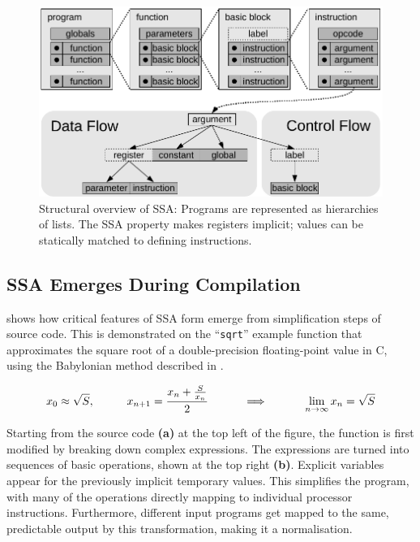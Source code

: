 \begin{figure}[h]
\centering
\includegraphics[width=\textwidth]{figures/ssaoverview}
\caption{Structural overview of SSA: Programs are represented as hierarchies of
    lists. The SSA property makes registers implicit; values can be statically
    matched to defining instructions.}
\label{fig:ssaoverview}
\end{figure}

\subsection{SSA Emerges During Compilation}

     shows how critical features of SSA form emerge from
    simplification steps of source code.
    This is demonstrated on the ``{\tt sqrt}'' example function that
    approximates the square root of a double-precision floating-point value
    in C, using the Babylonian method described in .

\begin{equation}
    x_0\approx\sqrt{S},\text{\hspace{1cm}}
    x_{n+1}=\frac{x_n+\frac{S}{x_n}}{2}\text{\hspace{1cm}}
    \implies\text{\hspace{1cm}}
    \lim_{n\rightarrow\infty}x_n=\sqrt{S}
    \label{babylonian_equation}
\end{equation}

    Starting from the source code {\bf(a)} at the top left of the figure, the
    function is first modified by breaking down complex expressions.
    The expressions are turned into sequences of basic operations, shown at the
    top right {\bf(b)}.
    Explicit variables appear for the previously implicit temporary values.
    This simplifies the program, with many of the operations directly mapping to
    individual processor instructions.
    Furthermore, different input programs get mapped to the same,
    predictable output by this transformation, making it a normalisation.

